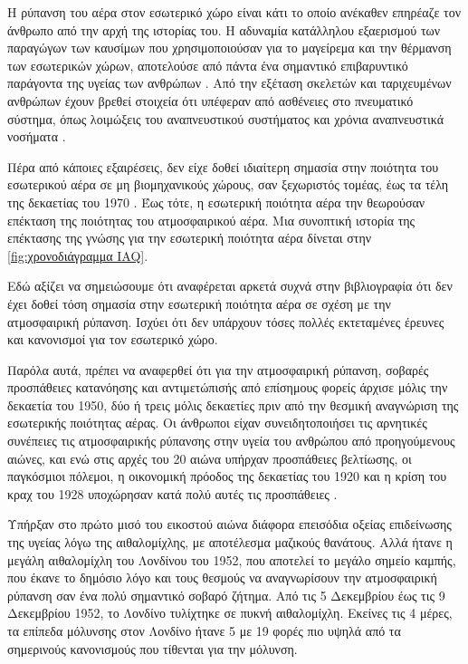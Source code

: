 Η ρύπανση του αέρα στον εσωτερικό χώρο είναι κάτι το οποίο ανέκαθεν επηρέαζε τον άνθρωπο από την αρχή της ιστορίας του. 
Η αδυναμία κατάλληλου εξαερισμού των παραγώγων των καυσίμων που χρησιμοποιούσαν για το μαγείρεμα και την θέρμανση των εσωτερικών χώρων, αποτελούσε από πάντα ένα σημαντικό επιβαρυντικό παράγοντα της υγείας των ανθρώπων \cite{JONES1999}.
Από την εξέταση σκελετών και ταριχευμένων ανθρώπων έχουν βρεθεί στοιχεία ότι υπέφεραν από ασθένειες στο πνευματικό σύστημα, όπως λοιμώξεις του αναπνευστικού συστήματος και χρόνια αναπνευστικά νοσήματα \cite{PhilipWexler2015}. 

Πέρα από κάποιες εξαιρέσεις, δεν είχε δοθεί ιδιαίτερη σημασία στην ποιότητα του εσωτερικού αέρα σε μη βιομηχανικούς χώρους,
σαν ξεχωριστός τομέας, έως τα τέλη της δεκαετίας του 1970 \cite{Sundell2004}.
Έως τότε, η εσωτερική ποιότητα αέρα την θεωρούσαν  επέκταση της ποιότητας του ατμοσφαιρικού αέρα.
Μια συνοπτική ιστορία της επέκτασης της γνώσης για την εσωτερική ποιότητα αέρα 
δίνεται στην \autoref{fig:χρονοδιάγραμμα IAQ}.

Εδώ αξίζει να σημειώσουμε ότι αναφέρεται αρκετά συχνά στην βιβλιογραφία ότι δεν έχει δοθεί τόση σημασία στην εσωτερική ποιότητα αέρα σε σχέση με την ατμοσφαιρική ρύπανση.
Ισχύει ότι δεν υπάρχουν τόσες πολλές  εκτεταμένες έρευνες και κανονισμοί για τον εσωτερικό χώρο.

Παρόλα αυτά, πρέπει να αναφερθεί ότι για την ατμοσφαιρική ρύπανση, σοβαρές προσπάθειες κατανόησης και αντιμετώπισής από επίσημους φορείς άρχισε μόλις την δεκαετία του 1950,
δύο ή τρεις μόλις δεκαετίες πριν από την θεσμική αναγνώριση της εσωτερικής ποιότητας αέρας. 
Οι άνθρωποι είχαν συνειδητοποιήσει τις αρνητικές συνέπειες τις ατμοσφαιρικής ρύπανσης στην υγεία του ανθρώπου από προηγούμενους αιώνες, και ενώ στις αρχές του 20 αιώνα υπήρχαν προσπάθειες βελτίωσης, οι παγκόσμιοι πόλεμοι, η οικονομική πρόοδος της δεκαετίας του 1920 και η κρίση του κραχ του 1928 υποχώρησαν κατά πολύ αυτές τις προσπάθειες \cite{CMMGroup}\cite{Fowler2020}.

Υπήρξαν στο πρώτο μισό του εικοστού αιώνα διάφορα επεισόδια οξείας επιδείνωσης της υγείας λόγω της αιθαλομίχλης, με αποτέλεσμα μαζικούς θανάτους. 
Αλλά ήτανε η μεγάλη αιθαλομίχλη του Λονδίνου του 1952, που αποτελεί το μεγάλο σημείο καμπής, που έκανε το δημόσιο λόγο και τους θεσμούς να αναγνωρίσουν την ατμοσφαιρική ρύπανση σαν ένα πολύ σημαντικό σοβαρό ζήτημα. Από τις 5 Δεκεμβρίου έως τις 9 Δεκεμβρίου 1952, το Λονδίνο τυλίχτηκε σε πυκνή αιθαλομίχλη. Εκείνες τις 4 μέρες, τα επίπεδα μόλυνσης στον Λονδίνο ήτανε 5 με 19 φορές πιο υψηλά από τα σημερινούς κανονισμούς που τίθενται για την μόλυνση.
 
